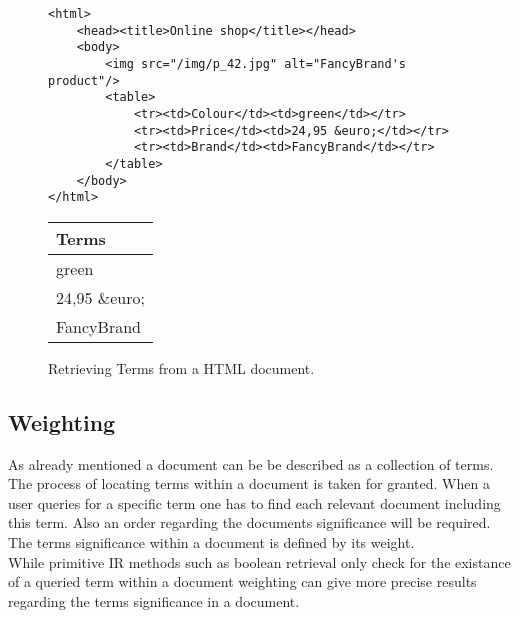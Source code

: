 \begin{figure}[h]
    \center
    \begin{lstlisting}
<html>
    <head><title>Online shop</title></head>
    <body>
        <img src="/img/p_42.jpg" alt="FancyBrand's product"/>
        <table>
            <tr><td>Colour</td><td>green</td></tr>
            <tr><td>Price</td><td>24,95 &euro;</td></tr>
            <tr><td>Brand</td><td>FancyBrand</td></tr>
        </table>
    </body>
</html>
    \end{lstlisting}
    \begin{tabular}{ l }
        \rowcolor{\dustRowHead}
        \textbf{Terms}\\\hline
        green\\
        24,95 \&euro;\\
        FancyBrand%
    \end{tabular}
    \caption{Retrieving Terms from a HTML document.}
    \label{fig:TermRetrieving}
\end{figure}


\subsection{Weighting}
\label{sec:weighting}
As already mentioned a document can be be described as a collection of terms.
The process of locating terms within a document is taken for granted.
When a user queries for a specific term one has to find each relevant document including this term.
Also an order regarding the documents significance will be required.
The terms significance within a document is defined by its weight.\citep[p.~117]{manning:2009}\\
While primitive IR methods such as boolean retrieval only check for the existance of a queried term within a document weighting can give more precise results regarding the terms significance in a document.\citep[p.~109]{manning:2009}

